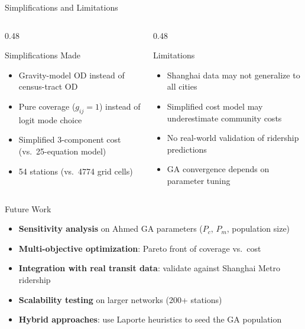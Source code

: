 \documentclass[aspectratio=169, 11pt]{beamer}
\begin{document}
\begin{frame}{Simplifications and Limitations}

\begin{columns}[T]
\begin{column}{0.48\textwidth}
\begin{block}{Simplifications Made}
\begin{itemize}
    \item Gravity-model OD instead of census-tract OD
    \item Pure coverage (\(g_{ij}=1\)) instead of logit mode choice
    \item Simplified 3-component cost (vs.\ 25-equation model)
    \item 54 stations (vs.\ 4774 grid cells)
\end{itemize}
\end{block}
\end{column}
\begin{column}{0.48\textwidth}
\begin{block}{Limitations}
\begin{itemize}
    \item Shanghai data may not generalize to all cities
    \item Simplified cost model may underestimate community costs
    \item No real-world validation of ridership predictions
    \item GA convergence depends on parameter tuning
\end{itemize}
\end{block}
\end{column}
\end{columns}
\end{frame}

\begin{frame}{Future Work}

\begin{itemize}
    \item \textbf{Sensitivity analysis} on Ahmed GA parameters (\(P_c\), \(P_m\), population size)
    \item \textbf{Multi-objective optimization}: Pareto front of coverage vs.\ cost
    \item \textbf{Integration with real transit data}: validate against Shanghai Metro ridership
    \item \textbf{Scalability testing} on larger networks (200+ stations)
    \item \textbf{Hybrid approaches}: use Laporte heuristics to seed the GA population
\end{itemize}
\end{frame}
\end{document}

